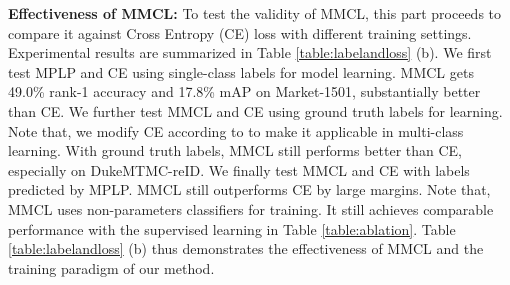 \documentclass[10pt,twocolumn,letterpaper]{article}
\begin{document}
\textbf{Effectiveness of MMCL:} To test the validity of MMCL, this part proceeds to compare it against Cross Entropy (CE) loss with different training settings. Experimental results are summarized in Table \ref{table:labelandloss} (b). We first test MPLP and CE using single-class labels for model learning. MMCL gets 49.0\% rank-1 accuracy and 17.8\% mAP on Market-1501, substantially better than CE. We further test MMCL and CE using ground truth labels for learning. Note that, we modify CE according to \cite{zhong2019invariance} to make it applicable in multi-class learning. With ground truth labels, MMCL still performs better than CE, especially on DukeMTMC-reID. We finally test MMCL and CE with labels predicted by MPLP. MMCL still outperforms CE by large margins. Note that, MMCL uses non-parameters classifiers for training. It still achieves comparable performance with the supervised learning in Table \ref{table:ablation}. Table \ref{table:labelandloss} (b) thus demonstrates the effectiveness of MMCL and the training paradigm of our method.
\end{document}
